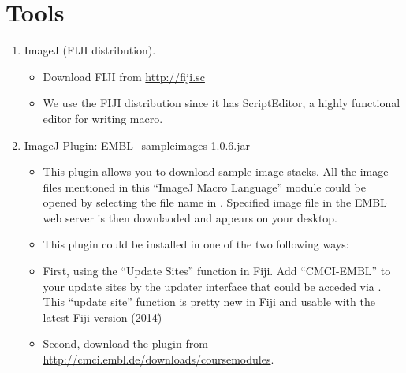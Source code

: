 \section{Tools}
\label{sec:tools}

\begin{enumerate}
  \item ImageJ (FIJI distribution).

\begin{itemize}
    \item Download FIJI from \url{http://fiji.sc}
    \item We use the FIJI distribution since it has ScriptEditor, a highly functional editor for writing macro. 
  
\end{itemize}
  \item ImageJ Plugin: EMBL\_sampleimages-1.0.6.jar

\begin{itemize}
     \item This plugin allows you to download sample image stacks. All the image files mentioned in this ``ImageJ Macro Language'' module could be opened by selecting the file name in . Specified image file in the EMBL web server is then downlaoded and appears on your desktop.
    \item This plugin could be installed in one of the two following ways:
    \item First, using the ``Update Sites'' function in Fiji. Add ``CMCI-EMBL'' to your update sites by the updater interface that could be acceded via . This ``update site'' function is pretty new in Fiji and usable with the latest Fiji version (2014\~)        
    \item Second, download the plugin from \url{http://cmci.embl.de/downloads/coursemodules}. 
  
\end{itemize}

\end{enumerate}
 
\newpage